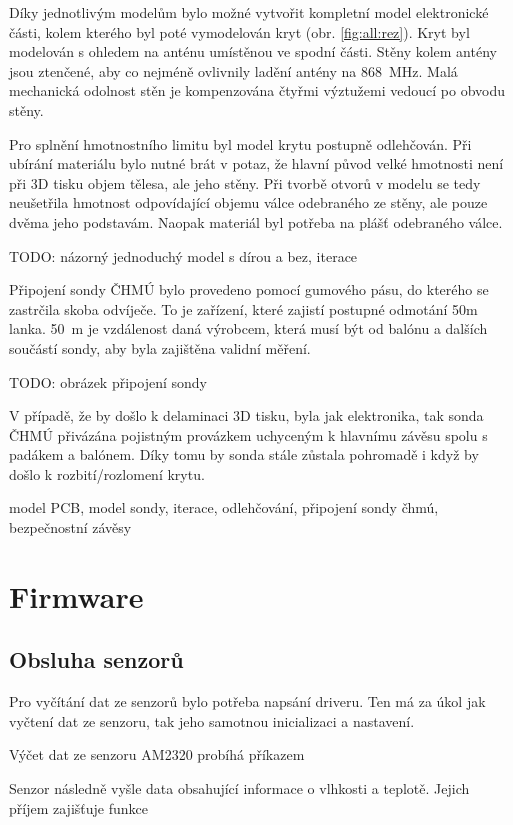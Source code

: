 \documentclass[twoside]{ctuthesis}
\theoremstyle{plain}
\theoremstyle{definition}
\theoremstyle{note}
\begin{document}
	
	Díky jednotlivým modelům bylo možné vytvořit kompletní model elektronické části, kolem kterého byl poté vymodelován kryt (obr. \ref{fig:all:rez}). Kryt byl modelován s ohledem na anténu umístěnou ve spodní části. Stěny kolem antény jsou ztenčené, aby co nejméně ovlivnily ladění antény na 868~MHz. Malá mechanická odolnost stěn je kompenzována čtyřmi výztužemi vedoucí po obvodu stěny.

	Pro splnění hmotnostního limitu byl model krytu postupně odlehčován. Při ubírání materiálu bylo nutné brát v potaz, že hlavní původ velké hmotnosti není při 3D tisku objem tělesa, ale jeho stěny. Při tvorbě otvorů v modelu se tedy neušetřila hmotnost odpovídající objemu válce odebraného ze stěny, ale pouze dvěma jeho podstavám. Naopak materiál byl potřeba na plášť odebraného válce.

	TODO: názorný jednoduchý model s dírou a bez, iterace 

	Připojení sondy ČHMÚ bylo provedeno pomocí gumového pásu, do kterého se zastrčila skoba odvíječe. To je zařízení, které zajistí postupné odmotání 50m lanka. 50~m je vzdálenost daná výrobcem, která musí být od balónu a dalších součástí sondy, aby byla zajištěna validní měření.

	TODO: obrázek připojení sondy

	V případě, že by došlo k delaminaci 3D tisku, byla jak elektronika, tak sonda ČHMÚ přivázána pojistným provázkem uchyceným k hlavnímu závěsu spolu s padákem a balónem. Díky tomu by sonda stále zůstala pohromadě i když by došlo k rozbití/rozlomení krytu.

	model PCB, model sondy, iterace, odlehčování, připojení sondy čhmú, bezpečnostní závěsy

	\section{Firmware}
	\subsection{Obsluha senzorů}
	Pro vyčítání dat ze senzorů bylo potřeba napsání driveru. Ten má za úkol jak vyčtení dat ze senzoru, tak jeho samotnou inicializaci a nastavení. 

	Výčet dat ze senzoru AM2320 probíhá příkazem
	

	Senzor následně vyšle data obsahující informace o vlhkosti a teplotě. Jejich příjem zajišťuje funkce
	
\end{document}
